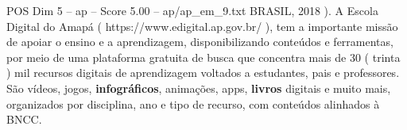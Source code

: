 \begin{textsample}{POS Dim 5 – ap – Score 5.00 – ap/ap\_em\_9.txt}
BRASIL, 2018 ).
A Escola Digital do Amapá ( https://www.edigital.ap.gov.br/ ), tem a importante missão de apoiar o ensino e a aprendizagem, disponibilizando conteúdos e ferramentas, por meio de uma plataforma gratuita de busca que concentra mais de 30 ( trinta ) mil recursos digitais de aprendizagem voltados a estudantes, pais e professores.
São vídeos, jogos, \textbf{infográficos}, animações, apps, \textbf{livros} digitais e muito mais, organizados por disciplina, ano e tipo de recurso, com conteúdos alinhados à BNCC.

\end{textsample}
